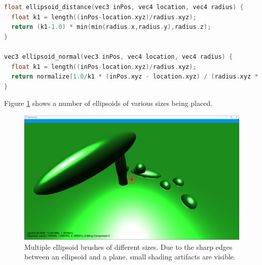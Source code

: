 \documentclass[11pt]{article}
\begin{document}
\begin{lstlisting}[language=C++,label={ellipsoid_sdf},caption={Approximate SDF and normal function for an ellipsoid.}]
float ellipsoid_distance(vec3 inPos, vec4 location, vec4 radius) {
  float k1 = length((inPos-location.xyz)/radius.xyz);
  return (k1-1.0) * min(min(radius.x,radius.y),radius.z);
}

vec3 ellipsoid_normal(vec3 inPos, vec4 location, vec4 radius) {
  float k1 = length((inPos-location.xyz)/radius.xyz);
  return normalize(1.0/k1 * (inPos.xyz - location.xyz) / (radius.xyz * radius.xyz));
}
\end{lstlisting}
Figure \ref{fig:editing_ellipsoids} shows a number of ellipsoids of various sizes being placed.
\begin{figure}[H]
  \includegraphics[width=\textwidth]{editing_ellipsoids}
  \caption{Multiple ellipsoid brushes of different sizes. Due to the sharp edges between an ellipsoid and a plane, small shading artifacts are visible.}
  \label{fig:editing_ellipsoids}
\end{figure}
\end{document}
